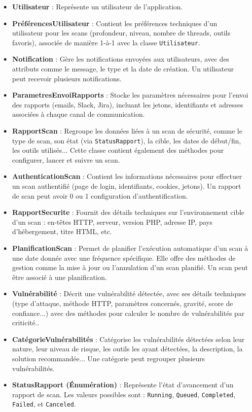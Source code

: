 \begin{itemize}[label=$*$]
    \item \textbf{Utilisateur} : Représente un utilisateur de l’application.
    \item \textbf{PréférencesUtilisateur} : Contient les préférences techniques d’un utilisateur pour les scans (profondeur, niveau, nombre de threads, outils favoris), associée de manière 1-à-1 avec la classe \texttt{Utilisateur}.
    
    \item \textbf{Notification} : Gère les notifications envoyées aux utilisateurs, avec des attributs comme le message, le type et la date de création. Un utilisateur peut recevoir plusieurs notifications.
    
    \item \textbf{ParametresEnvoiRapports} : Stocke les paramètres nécessaires pour l’envoi des rapports (emails, Slack, Jira), incluant les jetons, identifiants et adresses associées à chaque canal de communication.
    
    \item \textbf{RapportScan} : Regroupe les données liées à un scan de sécurité, comme le type de scan, son état (via \texttt{StatusRapport}), la cible, les dates de début/fin, les outils utilisés... Cette classe contient également des méthodes pour configurer, lancer et suivre un scan.
    
    \item \textbf{AuthenticationScan} : Contient les informations nécessaires pour effectuer un scan authentifié (page de login, identifiants, cookies, jetons). Un rapport de scan peut avoir 0 ou 1 configuration d’authentification.
    \item \textbf{RapportSecurite} : Fournit des détails techniques sur l’environnement cible d’un scan : en-têtes HTTP, serveur, version PHP, adresse IP, pays d’hébergement, titre HTML, etc.
    \item \textbf{PlanificationScan} : Permet de planifier l’exécution automatique d’un scan à une date donnée avec une fréquence spécifique. Elle offre des méthodes de gestion comme la mise à jour ou l’annulation d’un scan planifié. Un scan peut être associé à une planification. 
    \item \textbf{Vulnérabilité} : Décrit une vulnérabilité détectée, avec ses détails techniques (type d’attaque, méthode HTTP, paramètres concernés, gravité, score de confiance...) avec des méthodes pour calculer le nombre de vulnérabilités par criticité..
    \item \textbf{CatégorieVulnérabilités} : Catégorise les vulnérabilités détectées selon leur nature, leur niveau de risque, les outils les ayant détectées, la description,  la solution recommandée... Une catégorie peut regrouper plusieurs vulnérabilités.
    \item \textbf{StatusRapport (Énumération)} : Représente l’état d’avancement d’un rapport de scan. Les valeurs possibles sont : \texttt{Running}, \texttt{Queued}, \texttt{Completed}, \texttt{Failed}, et \texttt{Canceled}.
\end{itemize}
